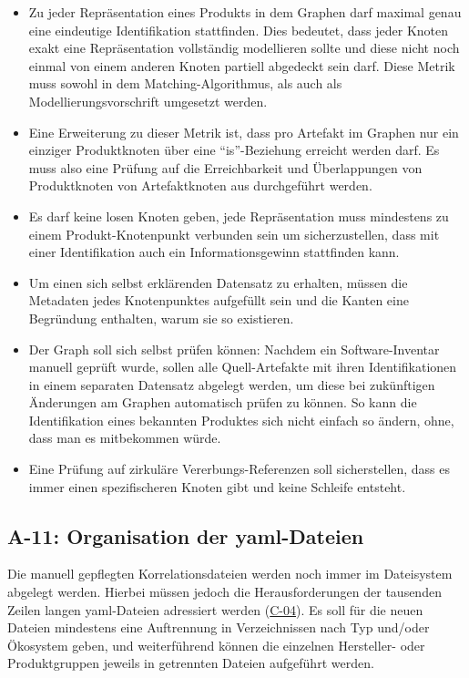 \begin{itemize}
    \item Zu jeder Repräsentation eines Produkts in dem Graphen darf maximal genau eine eindeutige Identifikation stattfinden.
    Dies bedeutet, dass jeder Knoten exakt eine Repräsentation vollständig modellieren sollte und diese nicht noch einmal von einem anderen Knoten partiell abgedeckt sein darf.
    Diese Metrik muss sowohl in dem Matching-Algorithmus, als auch als Modellierungsvorschrift umgesetzt werden.
    \item Eine Erweiterung zu dieser Metrik ist, dass pro Artefakt im Graphen nur ein einziger Produktknoten über eine \enquote{is}-Beziehung erreicht werden darf.
    Es muss also eine Prüfung auf die Erreichbarkeit und Überlappungen von Produktknoten von Artefaktknoten aus durchgeführt werden.
    \item Es darf keine losen Knoten geben, jede Repräsentation muss mindestens zu einem Produkt-Knotenpunkt verbunden sein um sicherzustellen, dass mit einer Identifikation auch ein Informationsgewinn stattfinden kann.
    \item Um einen sich selbst erklärenden Datensatz zu erhalten, müssen die Metadaten jedes Knotenpunktes aufgefüllt sein und die Kanten eine Begründung enthalten, warum sie so existieren.
    \item Der Graph soll sich selbst prüfen können: Nachdem ein Software-Inventar manuell geprüft wurde, sollen alle Quell-Artefakte mit ihren Identifikationen in einem separaten Datensatz abgelegt werden, um diese bei zukünftigen Änderungen am Graphen automatisch prüfen zu können.
    So kann die Identifikation eines bekannten Produktes sich nicht einfach so ändern, ohne, dass man es mitbekommen würde.
    \item Eine Prüfung auf zirkuläre Vererbungs-Referenzen soll sicherstellen, dass es immer einen spezifischeren Knoten gibt und keine Schleife entsteht.
\end{itemize}

\subsection{A-11: Organisation der \acrshort{yaml}-Dateien}\label{subsec:req-yaml-file-organization}

Die manuell gepflegten Korrelationsdateien werden noch immer im Dateisystem abgelegt werden.
Hierbei müssen jedoch die Herausforderungen der tausenden Zeilen langen \acrshort{yaml}-Dateien adressiert werden (\hyperref[subsec:c-04-groe-und-unubersichtliche-yaml-dateien]{C-04}).
Es soll für die neuen Dateien mindestens eine Auftrennung in Verzeichnissen nach Typ und/oder Ökosystem geben, und weiterführend können die einzelnen Hersteller- oder Produktgruppen jeweils in getrennten Dateien aufgeführt werden.

